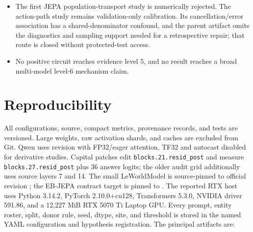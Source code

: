 \documentclass[10pt]{article}
\newcommand{\code}[1]{\texttt{#1}}
\begin{document}
\begin{itemize}[leftmargin=*]
  host; local GPU execution requires a disclosed Torch 2.10/cu128 deviation.
  Consequently a later model run can reproduce source/config semantics but not
  claim bitwise dependency equivalence.
  The Two Rooms dependency declaration omits three imported packages, and an
  exploratory MPPI action exceeded its configured norm.  Integration V1 is
  superseded for incomplete RNG control; corrected integration passes exact
  replay, and the planner bound defect is confirmed.  Neither establishes
  trained planning competence.
  \item The first JEPA population-transport study is numerically rejected.  The
  action-path study remains validation-only calibration.  Its cancellation/error
  association has a shared-denominator confound, and the parent artifact omits
  the diagnostics and sampling support needed for a retrospective repair; that
  route is closed without protected-test access.
  \item No positive circuit reaches evidence level 5, and no result reaches a
  broad multi-model level-6 mechanism claim.
\end{itemize}

\section{Reproducibility}

All configurations, source, compact metrics, provenance records, and tests are
versioned.  Large weights, raw activation shards, and caches are excluded from
Git.  Qwen uses revision
\texttt{} with FP32/eager attention,
TF32 and autocast disabled for derivative studies.  Capital patches edit
\code{blocks.21.resid\_post} and measure \code{blocks.27.resid\_post} plus 36
answer logits; the older audit grid additionally uses source layers 7 and 14.
The small LeWorldModel is source-pinned to official revision
\texttt{}; the EB-JEPA contract target is
pinned to \texttt{}.  The reported RTX host uses
Python 3.14.2, PyTorch 2.10.0+cu128, Transformers 5.3.0, NVIDIA driver 591.86,
and a 12,227 MiB RTX 5070 Ti Laptop GPU.  Every prompt, entity roster, split,
donor rule, seed, dtype, site, and threshold is stored in the named YAML
configuration and hypothesis registration.  The principal artifacts are:
\end{document}
